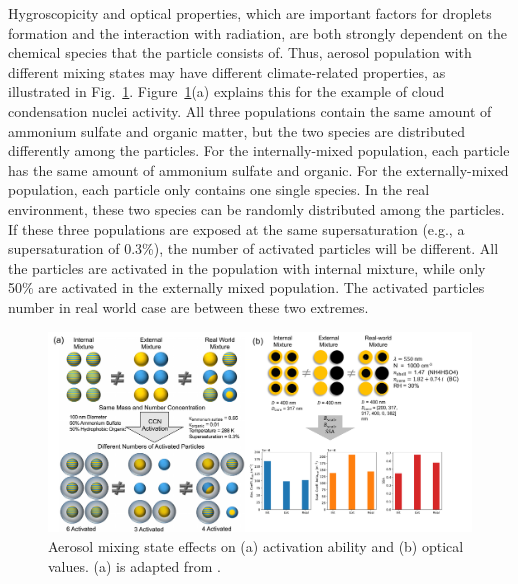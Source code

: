 \documentclass[edeposit,fullpage]{uiucthesis2009}
\begin{document}
Hygroscopicity and optical properties, which are important factors for
droplets formation and the interaction with radiation, are both
strongly dependent on the chemical species that the particle consists
of. Thus, aerosol population with different mixing states may have
different climate-related properties, as illustrated in
Fig.~\ref{fig:chap1-chi-climate}. Figure~\ref{fig:chap1-chi-climate}(a)
explains this for the example of cloud condensation nuclei
activity. All three populations contain the same amount of ammonium
sulfate and organic matter, but the two species are distributed
differently among the particles. For the internally-mixed population,
each particle has the same amount of ammonium sulfate and organic. For
the externally-mixed population, each particle only contains one
single species. In the real environment, these two species can be
randomly distributed among the particles. If these three populations
are exposed at the same supersaturation (e.g., a supersaturation of
0.3\%), the number of activated particles will be different. All the
particles are activated in the population with internal mixture, while
only 50\% are activated in the externally mixed population. The
activated particles number in real world case are between these two
extremes.

\begin{figure}
	\centering
	\includegraphics[scale=0.55]{chap1_figs/thesis_chap1_fig3.pdf}
	\caption{Aerosol mixing state effects on (a) activation
          ability and (b) optical values. (a) is adapted from
          \cite{Riemer2019}.}
	\label{fig:chap1-chi-climate}
\end{figure}
\end{document}
